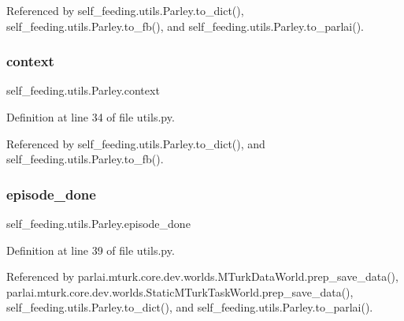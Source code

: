 Referenced by self\+\_\+feeding.\+utils.\+Parley.\+to\+\_\+dict(), self\+\_\+feeding.\+utils.\+Parley.\+to\+\_\+fb(), and self\+\_\+feeding.\+utils.\+Parley.\+to\+\_\+parlai().

\mbox{\label{classself__feeding_1_1utils_1_1Parley_af9775ca31a96e392ff557c9ae59fe473}} 
\subsubsection{\texorpdfstring{context}{context}}
{\footnotesize\ttfamily self\+\_\+feeding.\+utils.\+Parley.\+context}



Definition at line 34 of file utils.\+py.



Referenced by self\+\_\+feeding.\+utils.\+Parley.\+to\+\_\+dict(), and self\+\_\+feeding.\+utils.\+Parley.\+to\+\_\+fb().

\mbox{\label{classself__feeding_1_1utils_1_1Parley_a414815c0cc1270c732461edacbb5e000}} 
\subsubsection{\texorpdfstring{episode\+\_\+done}{episode\_done}}
{\footnotesize\ttfamily self\+\_\+feeding.\+utils.\+Parley.\+episode\+\_\+done}



Definition at line 39 of file utils.\+py.



Referenced by parlai.\+mturk.\+core.\+dev.\+worlds.\+M\+Turk\+Data\+World.\+prep\+\_\+save\+\_\+data(), parlai.\+mturk.\+core.\+dev.\+worlds.\+Static\+M\+Turk\+Task\+World.\+prep\+\_\+save\+\_\+data(), self\+\_\+feeding.\+utils.\+Parley.\+to\+\_\+dict(), and self\+\_\+feeding.\+utils.\+Parley.\+to\+\_\+parlai().

\mbox{\label{classself__feeding_1_1utils_1_1Parley_ab9f2039de89de42c9e63bb5bfd119581}} 
